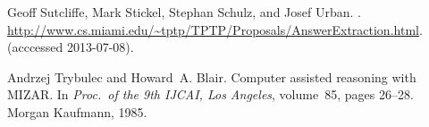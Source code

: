 \documentclass{article}
\begin{document}
\begin{thebibliography}{10}
Geoff Sutcliffe, Mark Stickel, Stephan Schulz, and Josef Urban.
.
\newblock
  \url{http://www.cs.miami.edu/~tptp/TPTP/Proposals/AnswerExtraction.html}.
\newblock (acccessed 2013-07-08).

Andrzej Trybulec and Howard~A. Blair.
\newblock Computer assisted reasoning with {MIZAR}.
\newblock In {\em Proc.\ of the 9th IJCAI, Los Angeles}, volume~85, pages
  26--28. Morgan Kaufmann, 1985.

\end{thebibliography}
\end{document}
